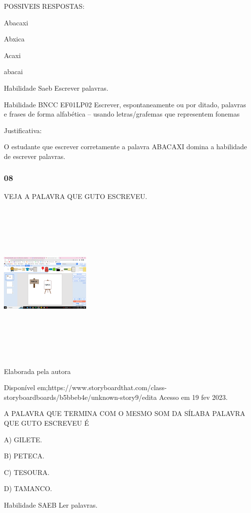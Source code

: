 \begin{escola}
\protect\hypertarget{_heading=h.3fwokq0}{}{}POSSIVEIS RESPOSTAS:

Abacaxi

Abxica

Acaxi

abacai

Habilidade Saeb Escrever palavras.

\protect\hypertarget{_heading=h.1v1yuxt}{}{}Habilidade BNCC EF01LP02
Escrever, espontaneamente ou por ditado, palavras e frases de forma
alfabética -- usando letras/grafemas que representem fonemas

Justificativa:

O estudante que escrever corretamente a palavra ABACAXI domina a
habilidade de escrever palavras.

\subsubsection{08}\label{section-33}

VEJA A PALAVRA QUE GUTO ESCREVEU.

\includegraphics[width=1.76042in,height=3.19514in]{media/image197.png}

Elaborada pela autora

Disponível
em;https://www.storyboardthat.com/class-storyboardboards/b5bbeb4e/unknown-story9/edita
Acesso em 19 fev 2023.

A PALAVRA QUE TERMINA COM O MESMO SOM DA SÍLABA PALAVRA QUE GUTO ESCREVEU
É

A) GILETE.

B) PETECA.

C) TESOURA.

D) TAMANCO.

Habilidade SAEB Ler palavras.


\end{escola}
